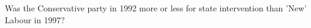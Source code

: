 \documentclass[11pt,compress,professionalfonts]{beamer}
\begin{document}
%
%
%
%
%
%





Was the Conservative party in 1992 more or less for state intervention than 'New' Labour in 
1997?
\end{document}
